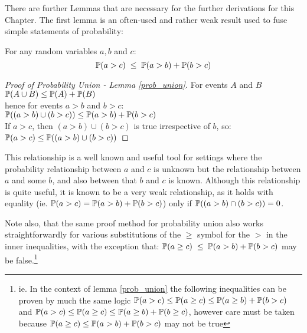 There are further Lemmas that are necessary for the further derivations for this Chapter.
The first lemma is an often-used and rather weak result used to fuse simple statements of probability:
\begin{lemma}\label{prob_union}
For any random variables $a,b$ and $c$:
\[\operatorname{\mathbb{P}}(a>c) \; \le \; \operatorname{\mathbb{P}}(a>b) + \operatorname{\mathbb{P}}(b>c)\]
\end{lemma}
\begin{proof}[Proof of Probability Union - Lemma \ref{prob_union}]
For events $A$ and $B$\\$\operatorname{\mathbb{P}}(A\cup B) \le \operatorname{\mathbb{P}}(A)+\operatorname{\mathbb{P}}(B)$\\
hence for events $a>b$ and $b>c$:\\ $\operatorname{\mathbb{P}}((a>b) \cup (b>c)) \le \operatorname{\mathbb{P}}(a>b) + \operatorname{\mathbb{P}}(b>c)$\\
If $a>c$, then $(a>b) \cup (b>c)$ is true irrespective of $b$, so:\\
$\operatorname{\mathbb{P}}(a>c) \le \operatorname{\mathbb{P}}((a>b) \cup (b>c))$
\end{proof}
This relationship is a well known and useful tool for settings where the probability relationship between $a$ and $c$ is unknown but the relationship between $a$ and some $b$, and also between that $b$ and $c$ is known.
Although this relationship is quite useful, it is known to be a very weak relationship, as it holds with equality (ie. $\operatorname{\mathbb{P}}(a>c)=\operatorname{\mathbb{P}}(a>b)+\operatorname{\mathbb{P}}(b>c)$) only if $\operatorname{\mathbb{P}}((a>b)\cap(b>c))=0$.

Note also, that the same proof method for probability union also works straightforwardly for various substitutions of the $\ge$ symbol for the $>$ in the inner inequalities, with the exception that: $\operatorname{\mathbb{P}}(a\ge c) \; \le \; \operatorname{\mathbb{P}}(a>b) + \operatorname{\mathbb{P}}(b>c)$ may be false.\footnote{ie. In the context of lemma \ref{prob_union} the following inequalities can be proven by much the same logic $\operatorname{\mathbb{P}}(a>c)\le\operatorname{\mathbb{P}}(a\ge c)\le\operatorname{\mathbb{P}}(a\ge b)+\operatorname{\mathbb{P}}(b>c)$ and $\operatorname{\mathbb{P}}(a>c)\le\operatorname{\mathbb{P}}(a\ge c)\le\operatorname{\mathbb{P}}(a\ge b)+\operatorname{\mathbb{P}}(b\ge c)$, however care must be taken because $\operatorname{\mathbb{P}}(a\ge c)\le\operatorname{\mathbb{P}}(a>b)+\operatorname{\mathbb{P}}(b>c)$ may not be true}

